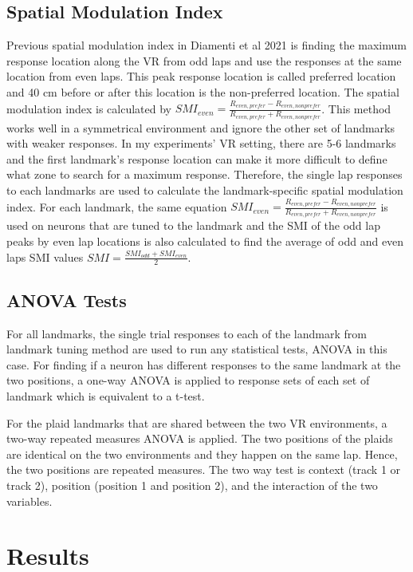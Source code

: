 \subsection{Spatial Modulation Index}
Previous spatial  modulation index in Diamenti et al 2021 is finding the maximum response location along the VR from odd laps and use the responses at the same location from even laps. This peak response location is called preferred location and 40 cm before or after this location is the non-preferred location. The spatial modulation index is calculated by \(SMI_{even} = \frac{R_{even , prefer} - R_{even , nonprefer}}{R_{even,prefer} + R_{even,nonprefer}}\). This method works well in a symmetrical environment and ignore the other set of landmarks with weaker responses. In my experiments' VR setting, there are 5-6 landmarks and the first landmark's response location can make it more difficult to define what zone to search for a maximum response. Therefore, the single lap responses to each landmarks are used to calculate the landmark-specific spatial modulation index. For each landmark, the same equation \(SMI_{even} = \frac{R_{even , prefer} - R_{even , nonprefer}}{R_{even,prefer} + R_{even,nonprefer}}\) is used on neurons that are tuned to the landmark and the SMI of the odd lap peaks by even lap locations is also calculated to find the average of odd and even laps SMI values \(SMI = \frac{SMI_{odd}+SMI_{even}}{2}\).

\subsection{ANOVA Tests}
For all landmarks, the single trial responses to each of the landmark from landmark tuning method are used to run any statistical tests, ANOVA in this case. For finding if a neuron has different responses to the same landmark at the two positions, a one-way ANOVA is applied to response sets of each set of landmark which is equivalent to a t-test.

For the plaid landmarks that are shared between the two VR environments, a two-way repeated measures ANOVA is applied. The two positions of the plaids are identical on the two environments and they happen on the same lap. Hence, the two positions are repeated measures. The two way test is context (track 1 or track 2), position (position 1 and position 2), and the interaction of the two variables.

\section{Results}
